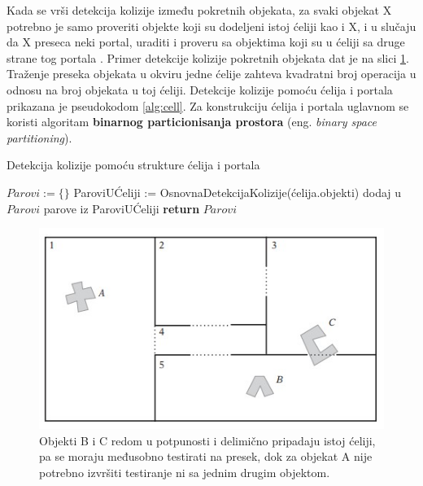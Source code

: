 \documentclass[12pt,oneside]{memoir}
\begin{document}
Kada se vrši detekcija kolizije između pokretnih objekata, za svaki objekat X 
potrebno je samo proveriti objekte koji su dodeljeni istoj ćeliji kao i X, i u slučaju
da X preseca neki portal, uraditi i proveru sa objektima koji su u ćeliji sa druge strane tog portala \cite{cells}.
Primer detekcije kolizije pokretnih objekata dat je na slici \ref{fig:cellsObj}.
Traženje preseka objekata u okviru jedne ćelije zahteva kvadratni broj operacija u odnosu na broj objekata u toj ćeliji.
Detekcije kolizije pomoću ćelija i portala prikazana je pseudokodom \ref{alg:cell}.
Za konstrukciju ćelija i portala uglavnom se koristi algoritam 
\textbf{binarnog particionisanja prostora} (eng. {\em binary space partitioning}).

\begin{algorithm}
	\caption{Detekcija kolizije pomoću strukture ćelija i portala}
    \label{alg:cell}
	\begin{algorithmic}[1]
		\State $Parovi := \{ \}$
			\State ParoviUĆeliji := OsnovnaDetekcijaKolizije(ćelija.objekti)
			\State dodaj u $Parovi$ parove iz ParoviUĆeliji
		\EndFor
		\State \textbf{return} $Parovi$
		\EndProcedure
    \end{algorithmic}
\end{algorithm}

\begin{figure}[h!]
	\begin{center}
	\includegraphics[scale=1]{cellsObj.jpg}
	\end{center}
	\caption{ Objekti B i C redom u potpunosti i delimično pripadaju istoj ćeliji, pa se moraju međusobno testirati na presek,
	 dok za objekat A nije potrebno izvršiti testiranje ni sa jednim drugim objektom. }
	\label{fig:cellsObj}
\end{figure}
\end{document}
